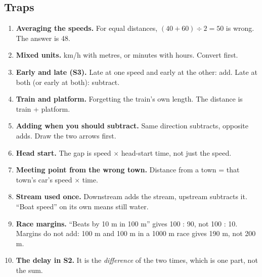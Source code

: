 \documentclass[11pt,a4paper]{article}
\let\oldsubsection\subsection
\renewcommand{\subsection}{\needspace{9\baselineskip}\oldsubsection}
\begin{document}
\subsection*{Traps}
\begin{enumerate}
\item \textbf{Averaging the speeds.} For equal distances, $(40+60)\div 2 = 50$ is wrong. The answer is 48.
\item \textbf{Mixed units.} km/h with metres, or minutes with hours. Convert first.
\item \textbf{Early and late (S3).} Late at one speed and early at the other: add. Late at both (or early at both): subtract.
\item \textbf{Train and platform.} Forgetting the train's own length. The distance is train + platform.
\item \textbf{Adding when you should subtract.} Same direction subtracts, opposite adds. Draw the two arrows first.
\item \textbf{Head start.} The gap is speed $\times$ head-start time, not just the speed.
\item \textbf{Meeting point from the wrong town.} Distance from a town = that town's car's speed $\times$ time.
\item \textbf{Stream used once.} Downstream adds the stream, upstream subtracts it. ``Boat speed'' on its own means still water.
\item \textbf{Race margins.} ``Beats by 10 m in 100 m'' gives 100 : 90, not 100 : 10. Margins do not add: 100 m and 100 m in a 1000 m race gives 190 m, not 200 m.
\item \textbf{The delay in S2.} It is the \emph{difference} of the two times, which is one part, not the sum.
\end{enumerate}
\end{document}
